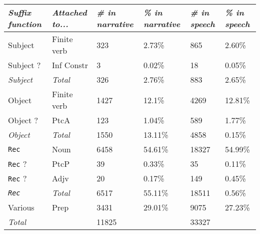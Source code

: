 \documentclass{report}
\newcommand{\mi}[1]{\lstinline{#1}}
\begin{document}
\begin{tabular}{|l|l|l|l|l|l|}
\hline
\emph{Suffix function} & \emph{Attached to...} & \emph{\# in narrative} & \emph{\% in narrative} & \emph{\# in speech} & \emph{\% in speech} \\ \hline
Subject & Finite verb & 323 & 2.73\% & 865 & 2.60\% \\ \hline
Subject ? & Inf Constr & 3 & 0.02\% & 18 & 0.05\% \\\hline
\emph{Subject} & \emph{Total} & 326 & 2.76\% & 883 & 2.65\% \\\hline
Object & Finite verb & 1427 & 12.1\% & 4269 & 12.81\% \\\hline
Object ? & PtcA & 123 & 1.04\%& 589 & 1.77\% \\\hline
\emph{Object} & \emph{Total} & 1550 & 13.11\% & 4858 & 0.15\% \\\hline
\mi{Rec} & Noun & 6458 & 54.61\% & 18327 & 54.99\% \\\hline
\mi{Rec} ? & PtcP & 39 & 0.33\% & 35 & 0.11\% \\\hline
\mi{Rec} ? & Adjv & 20 & 0.17\% & 149 & 0.45\% \\\hline
\emph{\mi{Rec}} & \emph{Total} & 6517 & 55.11\% & 18511 & 0.56\% \\\hline
Various & Prep & 3431 & 29.01\% & 9075 & 27.23\% \\\hline
\emph{Total} & & 11825 & & 33327 & \\
\hline
\end{tabular}

\noindent
\begin{minipage}{.5\textwidth}

\end{minipage}
\begin{minipage}{.5\textwidth}
\centering

\end{minipage}
\end{document}
